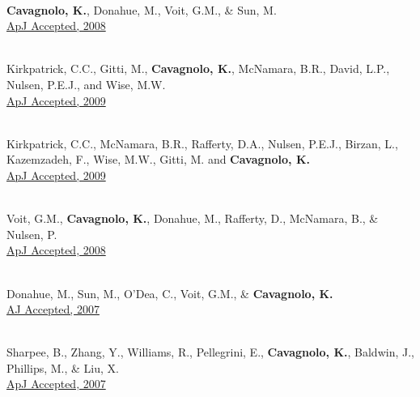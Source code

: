 \documentclass[12pt]{cv}
\begin{document}
\begin{llist}
{}\\
{\bf Cavagnolo, K.}, Donahue, M., Voit, G.M., \& Sun, M.\\
\href{http://adsabs.harvard.edu/abs/2008ApJ...682..821C}{ApJ Accepted, 2008}



{}\\
Kirkpatrick, C.C., Gitti, M., {\bf Cavagnolo, K.}, McNamara, B.R., David, L.P., Nulsen, P.E.J., and Wise, M.W.\\
\href{http://adsabs.harvard.edu/abs/2009arXiv0909.2252K}{ApJ Accepted, 2009}

{}\\
Kirkpatrick, C.C., McNamara, B.R., Rafferty, D.A., Nulsen, P.E.J., Birzan, L., Kazemzadeh, F., Wise, M.W., Gitti, M. and {\bf Cavagnolo, K.}\\
\href{http://adsabs.harvard.edu/abs/2009ApJ...697..867K}{ApJ Accepted, 2009}

{}\\
Voit, G.M., {\bf Cavagnolo, K.}, Donahue, M., Rafferty, D., McNamara, B., \& Nulsen, P.\\
\href{http://adsabs.harvard.edu/abs/2008ApJ...681L...5V}{ApJ Accepted, 2008}

{}\\
Donahue, M., Sun, M., O'Dea, C., Voit, G.M., \& {\bf Cavagnolo, K.}\\
\href{http://adsabs.harvard.edu/abs/2007AJ....134...14D}{AJ Accepted, 2007}

{}\\
Sharpee, B., Zhang, Y., Williams, R., Pellegrini, E., {\bf Cavagnolo, K.}, Baldwin, J., Phillips, M., \& Liu, X.\\
\href{http://adsabs.harvard.edu/abs/2007ApJ...659.1265S}{ApJ Accepted, 2007}


\end{llist}
\end{document}

